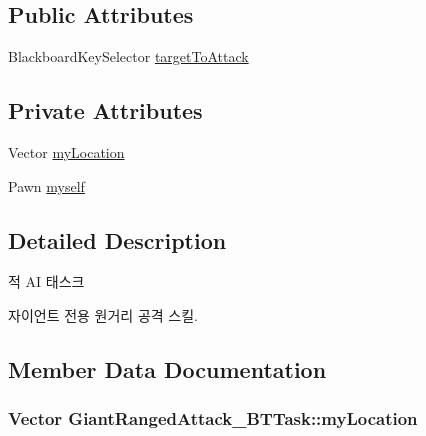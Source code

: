 \subsection*{Public Attributes}
\begin{DoxyCompactItemize}
\item 
Blackboard\+Key\+Selector \hyperlink{class_giant_ranged_attack___b_t_task_ad33350d20d5e08acc84fd65329562c63}{target\+To\+Attack}
\end{DoxyCompactItemize}
\subsection*{Private Attributes}
\begin{DoxyCompactItemize}
\item 
Vector \hyperlink{class_giant_ranged_attack___b_t_task_ad94fd43a278b675d241d6bfbea59efbf}{my\+Location}
\item 
Pawn \hyperlink{class_giant_ranged_attack___b_t_task_a897ee13f9ddeaa6e59a58ac85b7da3db}{myself}
\end{DoxyCompactItemize}


\subsection{Detailed Description}
적 AI 태스크 

자이언트 전용 원거리 공격 스킬. 

\subsection{Member Data Documentation}
\subsubsection[{\texorpdfstring{my\+Location}{myLocation}}]{\setlength{\rightskip}{0pt plus 5cm}Vector Giant\+Ranged\+Attack\+\_\+\+B\+T\+Task\+::my\+Location\hspace{0.3cm}{\ttfamily [private]}}\hypertarget{class_giant_ranged_attack___b_t_task_ad94fd43a278b675d241d6bfbea59efbf}{}\label{class_giant_ranged_attack___b_t_task_ad94fd43a278b675d241d6bfbea59efbf}
